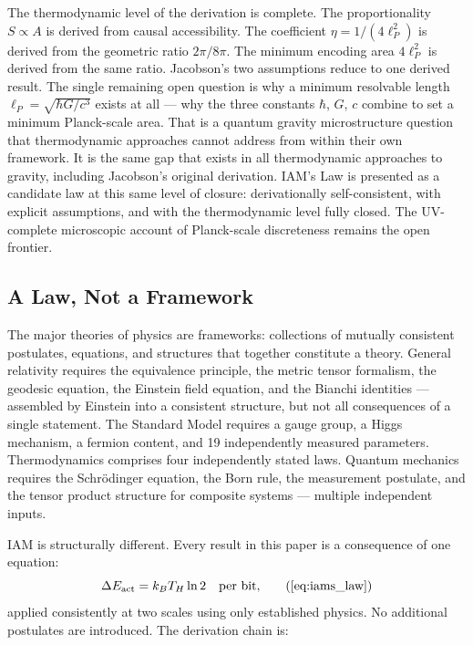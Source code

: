 \documentclass[12pt,a4paper]{article}
\begin{document}
The thermodynamic level of the derivation is complete. The
proportionality $S \propto A$ is derived from causal accessibility.
The coefficient $\eta = 1/(4\ell_P^2)$ is derived from the
geometric ratio $2\pi/8\pi$. The minimum encoding area $4\ell_P^2$
is derived from the same ratio. Jacobson's two assumptions reduce
to one derived result. The single remaining open question is why a
minimum resolvable length $\ell_P = \sqrt{\hbar G/c^3}$ exists at
all --- why the three constants $\hbar$, $G$, $c$ combine to set a
minimum Planck-scale area. That is a quantum gravity microstructure
question that thermodynamic approaches cannot address from within
their own framework. It is the same gap that exists in all
thermodynamic approaches to gravity, including Jacobson's original
derivation. IAM's Law is presented as a candidate law at this same
level of closure: derivationally self-consistent, with explicit
assumptions, and with the thermodynamic level fully closed. The
UV-complete microscopic account of Planck-scale discreteness
remains the open frontier.

\subsection{A Law, Not a Framework}

The major theories of physics are frameworks: collections of mutually
consistent postulates, equations, and structures that together
constitute a theory. General relativity requires the equivalence
principle, the metric tensor formalism, the geodesic equation, the
Einstein field equation, and the Bianchi identities --- assembled by
Einstein into a consistent structure, but not all consequences of a
single statement. The Standard Model requires a gauge group, a Higgs
mechanism, a fermion content, and 19 independently measured
parameters. Thermodynamics comprises four independently stated laws.
Quantum mechanics requires the Schr\"{o}dinger equation, the Born
rule, the measurement postulate, and the tensor product structure for
composite systems --- multiple independent inputs.

IAM is structurally different. Every result in this paper is a
consequence of one equation:
\begin{equation}
\Delta E_\mathrm{act} = k_B T_H \ln 2 \quad \text{per bit,}
\tag{\ref{eq:iams_law}}
\end{equation}
applied consistently at two scales using only established physics.
No additional postulates are introduced. The derivation chain is:
\end{document}
